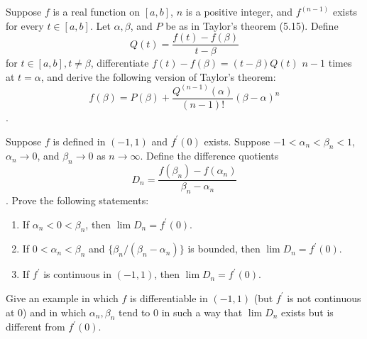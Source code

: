   \begin{exercise}[Rudin 5.18]
    Suppose $f$ is a real function on $[a, b]$, $n$ is a positive integer, and $f^{(n-1)}$ exists for every $t \in [a, b]$. Let $\alpha, \beta$, and $P$ be as in Taylor's theorem (5.15). Define
    \begin{equation}
      Q(t) = \frac{f(t) - f(\beta)}{t - \beta}
    \end{equation}
    for $t \in [a, b], t \ne \beta$, differentiate $f(t) - f(\beta) = (t - \beta)Q(t)$ $n-1$ times at $t = \alpha$, and derive the following version of Taylor's theorem:
    \begin{equation}
      f(\beta) = P(\beta) + \frac{Q^{(n-1)}(\alpha)}{(n-1)!} (\beta - \alpha)^n
    \end{equation}
   .
  \end{exercise}
  \begin{solution}

  \end{solution}

  \begin{exercise}[Rudin 5.19]
    Suppose $f$ is defined in $(-1, 1)$ and $f^\prime(0)$ exists. Suppose $-1 < \alpha_n < \beta_n < 1$, $\alpha_n \to 0$, and $\beta_n \to 0$ as $n \to \infty$. Define the difference quotients
    \begin{equation}
      D_n = \frac{f(\beta_n) - f(\alpha_n)}{\beta_n - \alpha_n}
    \end{equation}
   . Prove the following statements:
    \begin{enumerate}
      \item[(a)] If $\alpha_n < 0 < \beta_n$, then $\lim D_n = f^\prime(0)$.
      \item[(b)] If $0 < \alpha_n < \beta_n$ and $\{\beta_n/(\beta_n - \alpha_n)\}$ is bounded, then $\lim D_n = f^\prime(0)$.
      \item[(c)] If $f^\prime$ is continuous in $(-1, 1)$, then $\lim D_n = f^\prime(0)$.
    \end{enumerate}
    Give an example in which $f$ is differentiable in $(-1, 1)$ (but $f^\prime$ is not continuous at 0) and in which $\alpha_n, \beta_n$ tend to 0 in such a way that $\lim D_n$ exists but is different from $f^\prime(0)$.
  \end{exercise}
  \begin{solution}

  \end{solution}


